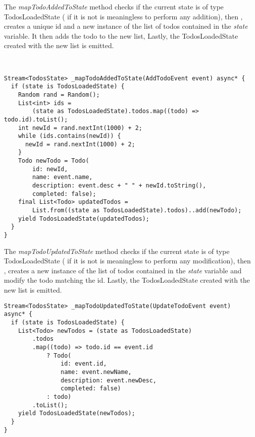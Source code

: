 The \textit{mapTodoAddedToState}  method checks if the current state is of type TodosLoadedState ( if it is not is meaningless to perform any addition), then , creates a unique id and a new instance of the list of todos contained in the \textit{state} variable. It  then adds the todo to the new list, Lastly, the TodosLoadedState  created with the new list is emitted. 
\begin{code}
\mbox{}\\
 \mbox{}
\label{code:2.14}
\begin{verbatim}
Stream<TodosState> _mapTodoAddedToState(AddTodoEvent event) async* {
  if (state is TodosLoadedState) {
    Random rand = Random();
    List<int> ids =
        (state as TodosLoadedState).todos.map((todo) => todo.id).toList();
    int newId = rand.nextInt(1000) + 2;
    while (ids.contains(newId)) {
      newId = rand.nextInt(1000) + 2;
    }
    Todo newTodo = Todo(
        id: newId,
        name: event.name,
        description: event.desc + " " + newId.toString(),
        completed: false);
    final List<Todo> updatedTodos =
        List.from((state as TodosLoadedState).todos)..add(newTodo);
    yield TodosLoadedState(updatedTodos);
  }
}
\end{verbatim}
\mbox{}
\end{code}


The \textit{mapTodoUpdatedToState} method checks if the current state is of type TodosLoadedState ( if it is not is meaningless to perform any modification), then , creates a new instance of the list of todos contained in the \textit{state} variable and modify the todo matching the id. Lastly, the TodosLoadedState  created with the new list is emitted. 

\begin{code}
\mbox{}
 \mbox{}
\label{code:2.14}
\begin{verbatim}
Stream<TodosState> _mapTodoUpdatedToState(UpdateTodoEvent event) async* {
  if (state is TodosLoadedState) {
    List<Todo> newTodos = (state as TodosLoadedState)
        .todos
        .map((todo) => todo.id == event.id
            ? Todo(
                id: event.id,
                name: event.newName,
                description: event.newDesc,
                completed: false)
            : todo)
        .toList();
    yield TodosLoadedState(newTodos);
  }
}
\end{verbatim}
\mbox{}
\end{code}
